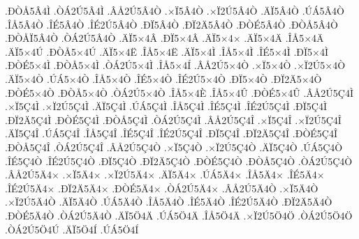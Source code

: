 {.^^d0^^d2^^c55^^c24^^cc
.^^d2^^c12^^da5^^c24^^cc
.^^c2^^c52^^da5^^c24^^d2
.^^d7^^cf5^^c24^^d2
.^^d7^^cf2^^da5^^c24^^d2
.^^c4^^cf5^^c24^^d2
.^^da^^c15^^c24^^d2
.^^ce^^c55^^c24^^d2
.^^ce^^c95^^c24^^d2
.^^ce^^c92^^da5^^c24^^d2
.^^d0^^cf5^^c24^^d2
.^^d0^^cf2^^c45^^c24^^d2
.^^d0^^d2^^c95^^c24^^d2
.^^d0^^d2^^c55^^c24^^d2
.^^d0^^d2^^c5^^cf5^^c24^^d2
.^^d2^^c12^^da5^^c24^^d2
.^^c4^^cf5^^d74^^c2
.^^d0^^cf5^^d74^^c2
.^^c4^^cf5^^d74^^d7
.^^c4^^cf5^^d74^^c4
.^^ce^^c55^^d74^^c4
.^^c4^^cf5^^d74^^da
.^^d0^^d2^^c55^^d74^^da
.^^c4^^cf5^^d74^^cb
.^^ce^^c55^^d74^^cb
.^^c4^^cf5^^d74^^cc
.^^ce^^c55^^d74^^cc
.^^ce^^c95^^d74^^cc
.^^d0^^cf5^^d74^^cc
.^^d0^^d2^^c95^^d74^^cc
.^^d0^^d2^^c55^^d74^^cc
.^^d2^^c12^^da5^^d74^^cc
.^^ce^^c55^^d74^^cd
.^^c2^^c52^^da5^^d74^^d2
.^^d7^^cf5^^d74^^d2
.^^d7^^cf2^^da5^^d74^^d2
.^^c4^^cf5^^d74^^d2
.^^da^^c15^^d74^^d2
.^^ce^^c55^^d74^^d2
.^^ce^^c95^^d74^^d2
.^^ce^^c92^^da5^^d74^^d2
.^^d0^^cf5^^d74^^d2
.^^d0^^cf2^^c45^^d74^^d2
.^^d0^^d2^^c95^^d74^^d2
.^^d0^^d2^^c55^^d74^^d2
.^^d2^^c12^^da5^^d74^^d2
.^^ce^^c55^^d74^^c8
.^^ce^^c55^^d74^^db
.^^d0^^d2^^c95^^d74^^db
.^^c2^^c52^^da5^^c74^^cc
.^^d7^^cf5^^c74^^cc
.^^d7^^cf2^^da5^^c74^^cc
.^^c4^^cf5^^c74^^cc
.^^da^^c15^^c74^^cc
.^^ce^^c55^^c74^^cc
.^^ce^^c95^^c74^^cc
.^^ce^^c92^^da5^^c74^^cc
.^^d0^^cf5^^c74^^cc
.^^d0^^cf2^^c45^^c74^^cc
.^^d0^^d2^^c95^^c74^^cc
.^^d0^^d2^^c55^^c74^^cc
.^^d2^^c12^^da5^^c74^^cc
.^^c2^^c52^^da5^^c74^^ce
.^^d7^^cf5^^c74^^ce
.^^d7^^cf2^^da5^^c74^^ce
.^^c4^^cf5^^c74^^ce
.^^da^^c15^^c74^^ce
.^^ce^^c55^^c74^^ce
.^^ce^^c95^^c74^^ce
.^^ce^^c92^^da5^^c74^^ce
.^^d0^^cf5^^c74^^ce
.^^d0^^cf2^^c45^^c74^^ce
.^^d0^^d2^^c95^^c74^^ce
.^^d0^^d2^^c55^^c74^^ce
.^^d2^^c12^^da5^^c74^^ce
.^^c2^^c52^^da5^^c74^^d2
.^^d7^^cf5^^c74^^d2
.^^d7^^cf2^^da5^^c74^^d2
.^^c4^^cf5^^c74^^d2
.^^da^^c15^^c74^^d2
.^^ce^^c95^^c74^^d2
.^^ce^^c92^^da5^^c74^^d2
.^^d0^^cf5^^c74^^d2
.^^d0^^cf2^^c45^^c74^^d2
.^^d0^^d2^^c95^^c74^^d2
.^^d0^^d2^^c55^^c74^^d2
.^^d2^^c12^^da5^^c74^^d2
.^^c2^^c52^^da5^^c44^^d7
.^^d7^^cf5^^c44^^d7
.^^d7^^cf2^^da5^^c44^^d7
.^^c4^^cf5^^c44^^d7
.^^da^^c15^^c44^^d7
.^^ce^^c55^^c44^^d7
.^^ce^^c95^^c44^^d7
.^^ce^^c92^^da5^^c44^^d7
.^^d0^^cf2^^c45^^c44^^d7
.^^d0^^d2^^c95^^c44^^d7
.^^d2^^c12^^da5^^c44^^d7
.^^c2^^c52^^da5^^c44^^d2
.^^d7^^cf5^^c44^^d2
.^^d7^^cf2^^da5^^c44^^d2
.^^c4^^cf5^^c44^^d2
.^^da^^c15^^c44^^d2
.^^ce^^c55^^c44^^d2
.^^ce^^c95^^c44^^d2
.^^ce^^c92^^da5^^c44^^d2
.^^d0^^cf2^^c45^^c44^^d2
.^^d0^^d2^^c95^^c44^^d2
.^^d2^^c12^^da5^^c44^^d2
.^^c4^^cf5^^d64^^c4
.^^da^^c15^^d64^^c4
.^^ce^^c55^^d64^^c4
.^^d7^^cf2^^da5^^d64^^d6
.^^d2^^c12^^da5^^d64^^d6
.^^d2^^c12^^da5^^d64^^da
.^^c4^^cf5^^d64^^cd
.^^da^^c15^^d64^^cd
}
